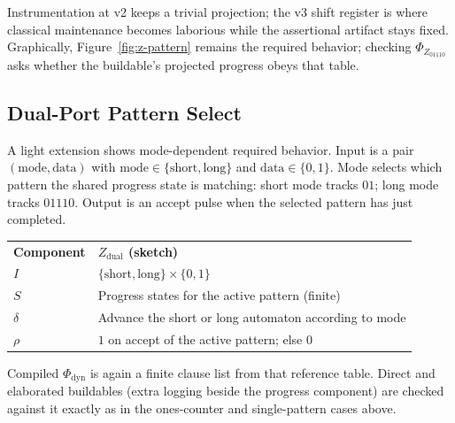 Instrumentation at v2 keeps a trivial projection; the v3 shift register is where classical maintenance becomes laborious while the assertional artifact stays fixed. Graphically, Figure~\ref{fig:z-pattern} remains the required behavior; checking $\Phi_{Z_{01110}}$ asks whether the buildable's projected progress obeys that table.

\subsection{Dual-Port Pattern Select}
\label{sec:case-dual}

A light extension shows mode-dependent required behavior. Input is a pair $(\mathrm{mode},\mathrm{data})$ with $\mathrm{mode}\in\{\mathrm{short},\mathrm{long}\}$ and $\mathrm{data}\in\{0,1\}$. Mode selects which pattern the shared progress state is matching: short mode tracks $01$; long mode tracks $01110$. Output is an accept pulse when the selected pattern has just completed.

\begingroup
\renewcommand{\arraystretch}{1.2}
\footnotesize
\begin{center}
\begin{tabularx}{0.78\linewidth}{@{}>{\raggedright\arraybackslash}p{2.8cm}Y@{}}
    \headingfont\bfseries Component & \headingfont\bfseries $Z_{\mathrm{dual}}$ (sketch) \\
    \addlinespace[2pt]
    $I$ & $\{\mathrm{short},\mathrm{long}\}\times\{0,1\}$ \\
    \addlinespace[2pt]
    $S$ & Progress states for the active pattern (finite) \\
    \addlinespace[2pt]
    $\delta$ & Advance the short or long automaton according to mode \\
    \addlinespace[2pt]
    $\rho$ & $1$ on accept of the active pattern; else $0$ \\
\end{tabularx}
\end{center}
\label{tab:z-dual}
\endgroup
\vspace{4pt}

Compiled $\Phi_{\mathrm{dyn}}$ is again a finite clause list from that reference table. Direct and elaborated buildables (extra logging beside the progress component) are checked against it exactly as in the ones-counter and single-pattern cases above.
